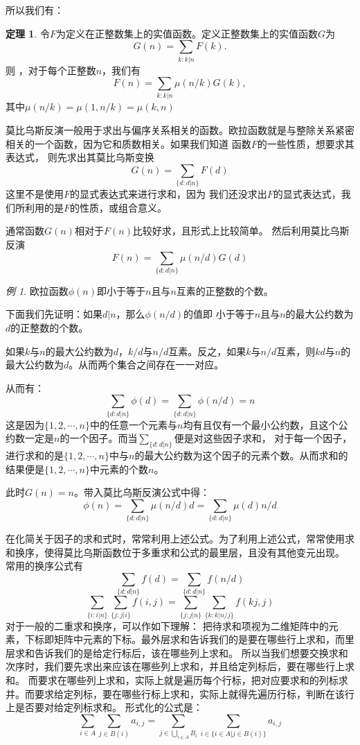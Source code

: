 \documentclass[a4paper,11pt]{article}%
\theoremstyle{remark}
\theoremstyle{remark}
\newtheorem*{example}{例}
\theoremstyle{definition}
\newtheorem{theorem}{定理}[section]
\theoremstyle{definition}
\theoremstyle{definition}
\begin{document}
        所以我们有：
        \begin{theorem}
            令$F$为定义在正整数集上的实值函数。定义正整数集上的实值函数$G$为
            \[G(n)=\sum_{k:k|n}F(k).\]
            则 ，对于每个正整数$n$，我们有 
            \[F(n)=\sum_{k:k|n}\mu(n/k)G(k),\]
            其中$\mu(n/k)=\mu(1,n/k)=\mu(k,n)$
        \end{theorem}
        莫比乌斯反演一般用于求出与偏序关系相关的函数。欧拉函数就是与整除关系紧密相关的一个函数，因为它和质数相关。如果我们知道 函数$F$的一些性质，想要求其表达式，
        则先求出其莫比乌斯变换
        \[G(n)=\sum_{\{d:d|n\}}F(d)\]
        这里不是使用$F$的显式表达式来进行求和，因为 我们还没求出$F$的显式表达式，我们所利用的是$F$的性质，或组合意义。
        
        通常函数$G(n)$相对于$F(n)$比较好求，且形式上比较简单。
        然后利用莫比乌斯反演
        \[F(n)=\sum_{\{d:d|n\}}\mu(n/d)G(d)\]
        \begin{example}
            欧拉函数$\phi(n)$即小于等于$n$且与$n$互素的正整数的个数。

            下面我们先证明：如果$d|n$，那么$\phi(n/d)$的值即 小于等于$n$且与$n$的最大公约数为$d$的正整数的个数。

            如果$k$与$n$的最大公约数为$d$，$k/d$与$n/d$互素。反之，如果$k$与$n/d$互素，则$kd$与$n$的最大公约数为$d$。从而两个集合之间存在一一对应。

            从而有：
            \[\sum_{\{d:d|n\}}\phi(d)=\sum_{\{d:d|n\}}\phi(n/d)=n\]
            这是因为$\{1,2,\cdots,n\}$中的任意一个元素与$n$均有且仅有一个最小公约数，且这个公约数一定是$n$的一个因子。而当$\sum_{\{d:d|n\}}$便是对这些因子求和，
            对于每一个因子，进行求和的是$\{1,2,\cdots,n\}$中与$n$的最大公约数为这个因子的元素个数。从而求和的结果便是$\{1,2,\cdots,n\}$中元素的个数$n$。

            此时$G(n)=n$。带入莫比乌斯反演公式中得：
            \[\phi(n)=\sum_{\{d:d|n\}}\mu(n/d)d=\sum_{\{d:d|n\}}\mu(d)n/d\]
        \end{example}
        在化简关于因子的求和式时，常常利用上述公式。为了利用上述公式，常常使用求和换序，使得莫比乌斯函数位于多重求和公式的最里层，且没有其他变元出现。
        常用的换序公式有
        \[\sum_{\{d:d|n\}}f(d)=\sum_{\{d:d|n\}}f(n/d)\]
        \[\sum_{\{i:i|n\}}\sum_{\{j:j|i\}}f(i,j)=\sum_{\{j:j|n\}}\sum_{\{k:k|n/j\}}f(kj,j)\]
        对于一般的二重求和换序，可以作如下理解：
        把待求和项视为二维矩阵中的元素，下标即矩阵中元素的下标。最外层求和告诉我们的是要在哪些行上求和，而里层求和告诉我们的是给定行标后，该在哪些列上求和。
        所以当我们想要交换求和次序时，我们要先求出来应该在哪些列上求和，并且给定列标后，要在哪些行上求和。
        而要求在哪些列上求和，实际上就是遍历每个行标，把对应要求和的列标求并。而要求给定列标，要在哪些行标上求和，实际上就得先遍历行标，判断在该行上是否要对给定列标求和。
        形式化的公式是：
        \[\sum_{i\in A}\sum_{j\in B(i)}a_{i,j}=\sum_{j\in \bigcup_{i\in A}B_i}\sum_{i\in\{i\in A|j\in B(i)\}}a_{i,j}\]
\end{document}
